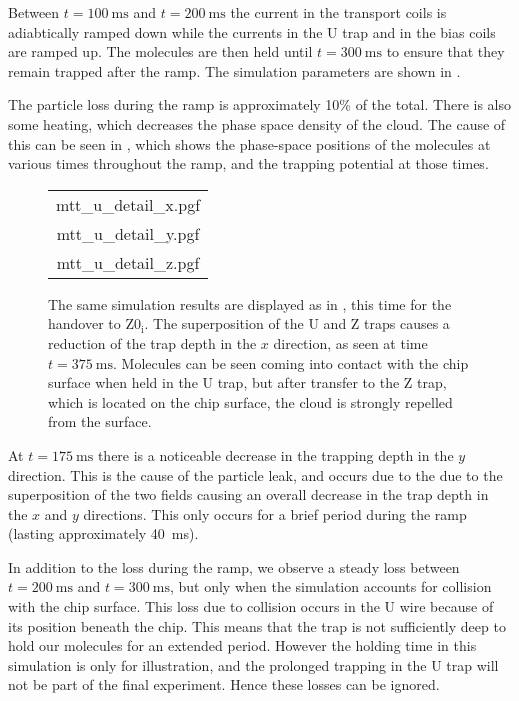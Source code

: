 Between $t=\SI{100}{\milli\second}$ and $t=\SI{200}{\milli\second}$ the current
in the transport coils is adiabtically ramped down while the currents in
the U trap and in the bias coils are ramped up. The molecules are then held
until $t=\SI{300}{\milli\second}$ to ensure that they remain trapped after the
ramp. The simulation parameters are shown in
.

The particle loss during the ramp is approximately 10\% of the total. There is
also some heating, which decreases the phase space density of the cloud. The
cause of this can be seen in , which shows the
phase-space positions of the molecules at various times throughout the ramp,
and the trapping potential at those times.

\begin{figure}[p]
\centering
  \begin{tabular}{c}
  {mtt_u_detail_x.pgf} \\
  {mtt_u_detail_y.pgf} \\
  {mtt_u_detail_z.pgf}
  \end{tabular}
  \caption{
    The same simulation results are displayed as in
    , this time for the handover to $\mathrm{Z0_i}$.
    The superposition of the U and Z traps causes a reduction of the trap depth
    in the $x$ direction, as seen at time $t=\SI{375}{\milli\second}$.
    Molecules can be seen coming into contact with the chip surface when held
    in the U trap, but after transfer to the Z trap, which is located on the
    chip surface, the cloud is strongly repelled from the surface.
  }
  \label{design:fig:mttudetail}
\end{figure}

At $t=\SI{175}{\milli\second}$ there is a noticeable decrease in the trapping
depth in the $y$ direction. This is the cause of the particle leak, and occurs
due to the due to the superposition of the two fields causing an overall
decrease in the trap depth in the $x$ and $y$ directions. This only occurs for
a brief period during the ramp (lasting approximately \SI{40}{\milli\second}). 

In addition to the loss during the ramp, we observe a steady loss between
$t=\SI{200}{\milli\second}$ and $t=\SI{300}{\milli\second}$, but only when the
simulation accounts for collision with the chip surface. This loss due to
collision occurs in the U wire because of its position beneath the chip. This
means that the trap is not sufficiently deep to hold our molecules for an
extended period. However the holding time in this simulation is only for
illustration, and the prolonged trapping in the U trap will not be part of the
final experiment. Hence these losses can be ignored.

